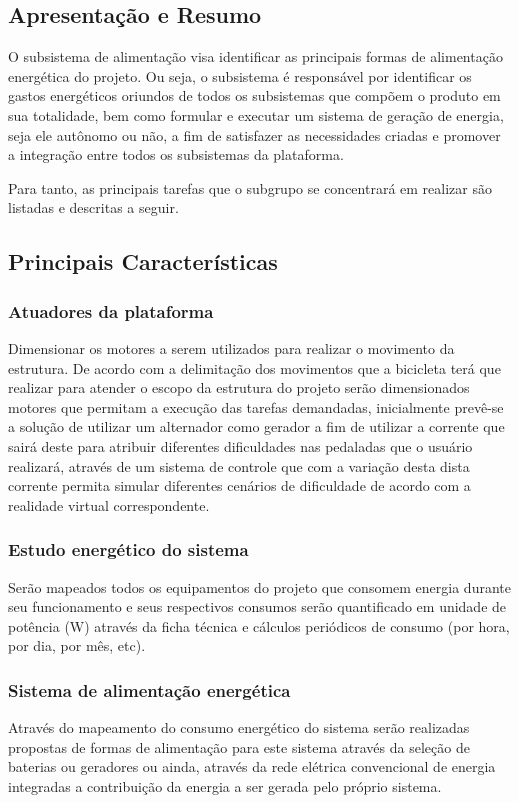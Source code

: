 \subsection{Apresentação e Resumo}
O subsistema de alimentação visa identificar as principais formas de alimentação energética do projeto. Ou seja, o subsistema é responsável por identificar os gastos energéticos oriundos de todos os subsistemas que compõem o produto em sua totalidade, bem como formular e executar um sistema de geração de energia, seja ele autônomo ou não,  a fim de satisfazer as necessidades criadas e promover a integração entre todos os subsistemas da plataforma.

Para tanto, as principais tarefas que o subgrupo se concentrará em realizar são listadas e descritas a seguir.

\subsection{Principais Características}
\subsubsection{Atuadores da plataforma}
	Dimensionar os motores a serem utilizados para realizar o movimento da estrutura. De acordo com a delimitação dos movimentos que a bicicleta terá que realizar para atender o escopo da estrutura do projeto serão dimensionados motores que permitam a execução das tarefas demandadas, inicialmente prevê-se a solução de utilizar um alternador como gerador a fim de utilizar a corrente que sairá deste para atribuir diferentes dificuldades nas pedaladas que o usuário realizará, através de um sistema de controle que com a variação desta dista corrente permita simular diferentes cenários de dificuldade de acordo com a realidade virtual correspondente.

\subsubsection{Estudo energético do sistema}
Serão mapeados todos os equipamentos do projeto que consomem energia durante seu funcionamento e seus respectivos consumos serão quantificado em unidade de potência (W) através da ficha técnica e cálculos periódicos de consumo (por hora, por dia, por mês, etc).

\subsubsection{Sistema de alimentação energética} Através do mapeamento do consumo energético do sistema serão realizadas propostas de formas de alimentação para este sistema através da seleção de baterias ou geradores ou ainda, através da rede elétrica convencional de energia integradas a contribuição da energia a ser gerada pelo próprio sistema.

